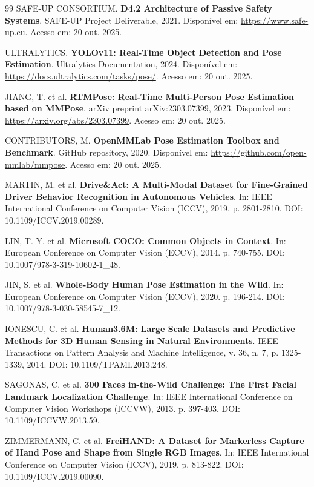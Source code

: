 \documentclass[12pt, a4paper]{article}
\begin{document}
\begin{thebibliography}{99}
SAFE-UP CONSORTIUM. \textbf{D4.2 Architecture of Passive Safety Systems}. SAFE-UP Project Deliverable, 2021. Disponível em: \url{https://www.safe-up.eu}. Acesso em: 20 out. 2025.

ULTRALYTICS. \textbf{YOLOv11: Real-Time Object Detection and Pose Estimation}. Ultralytics Documentation, 2024. Disponível em: \url{https://docs.ultralytics.com/tasks/pose/}. Acesso em: 20 out. 2025.

JIANG, T. et al. \textbf{RTMPose: Real-Time Multi-Person Pose Estimation based on MMPose}. arXiv preprint arXiv:2303.07399, 2023. Disponível em: \url{https://arxiv.org/abs/2303.07399}. Acesso em: 20 out. 2025.

CONTRIBUTORS, M. \textbf{OpenMMLab Pose Estimation Toolbox and Benchmark}. GitHub repository, 2020. Disponível em: \url{https://github.com/open-mmlab/mmpose}. Acesso em: 20 out. 2025.

MARTIN, M. et al. \textbf{Drive\&Act: A Multi-Modal Dataset for Fine-Grained Driver Behavior Recognition in Autonomous Vehicles}. In: IEEE International Conference on Computer Vision (ICCV), 2019. p. 2801-2810. DOI: 10.1109/ICCV.2019.00289.

LIN, T.-Y. et al. \textbf{Microsoft COCO: Common Objects in Context}. In: European Conference on Computer Vision (ECCV), 2014. p. 740-755. DOI: 10.1007/978-3-319-10602-1\_48.

JIN, S. et al. \textbf{Whole-Body Human Pose Estimation in the Wild}. In: European Conference on Computer Vision (ECCV), 2020. p. 196-214. DOI: 10.1007/978-3-030-58545-7\_12.

IONESCU, C. et al. \textbf{Human3.6M: Large Scale Datasets and Predictive Methods for 3D Human Sensing in Natural Environments}. IEEE Transactions on Pattern Analysis and Machine Intelligence, v. 36, n. 7, p. 1325-1339, 2014. DOI: 10.1109/TPAMI.2013.248.

SAGONAS, C. et al. \textbf{300 Faces in-the-Wild Challenge: The First Facial Landmark Localization Challenge}. In: IEEE International Conference on Computer Vision Workshops (ICCVW), 2013. p. 397-403. DOI: 10.1109/ICCVW.2013.59.

ZIMMERMANN, C. et al. \textbf{FreiHAND: A Dataset for Markerless Capture of Hand Pose and Shape from Single RGB Images}. In: IEEE International Conference on Computer Vision (ICCV), 2019. p. 813-822. DOI: 10.1109/ICCV.2019.00090.


\end{thebibliography}
\end{document}
